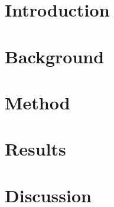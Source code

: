 \documentclass{article}
\numberwithin{equation}{section}
\theoremstyle{plain}
\begin{document}

\noindent

\section{Introduction}


\section{Background}
% 

\section{Method}

\section{Results}

\section{Discussion}










%
\end{document}
